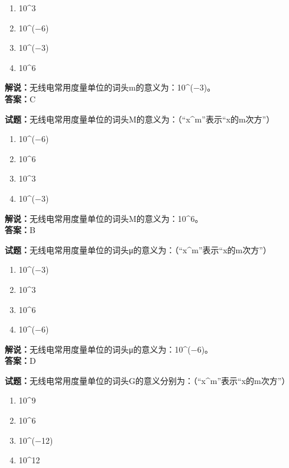 \documentclass{ctexbook}
\begin{document}
\begin{enumerate}[leftmargin=3em]
  \item \num{10}\string^\num{3}
  \item \num{10}\string^(\num{-6})
  \item \num{10}\string^(\num{-3})
  \item \num{10}\string^\num{6}
\end{enumerate}

\noindent\textbf{解说：}无线电常用度量单位的词头m的意义为：\num{10}\string^(\num{-3})。\cite[143]{si}\\
\noindent\textbf{答案：}C

\bigskip

\noindent\textbf{试题：}无线电常用度量单位的词头M的意义为：（“x\string^m”表示“x的m次方”）

\begin{enumerate}[leftmargin=3em]
  \item \num{10}\string^(\num{-6})
  \item \num{10}\string^\num{6}
  \item \num{10}\string^\num{3}
  \item \num{10}\string^(\num{-3})
\end{enumerate}

\noindent\textbf{解说：}无线电常用度量单位的词头M的意义为：\num{10}\string^\num{6}。\cite[143]{si}\\
\noindent\textbf{答案：}B

\bigskip

\noindent\textbf{试题：}无线电常用度量单位的词头μ的意义为：（“x\string^m”表示“x的m次方”）

\begin{enumerate}[leftmargin=3em]
  \item \num{10}\string^(\num{-3})
  \item \num{10}\string^\num{3}
  \item \num{10}\string^\num{6}
  \item \num{10}\string^(\num{-6})
\end{enumerate}

\noindent\textbf{解说：}无线电常用度量单位的词头μ的意义为：\num{10}\string^(\num{-6})。\cite[143]{si}\\
\noindent\textbf{答案：}D

\bigskip

\noindent\textbf{试题：}无线电常用度量单位的词头G的意义分别为：（“x\string^m”表示“x的m次方”）

\begin{enumerate}[leftmargin=3em]
  \item \num{10}\string^\num{9}
  \item \num{10}\string^\num{6}
  \item \num{10}\string^(\num{-12})
  \item \num{10}\string^\num{12}
\end{enumerate}
\end{document}
